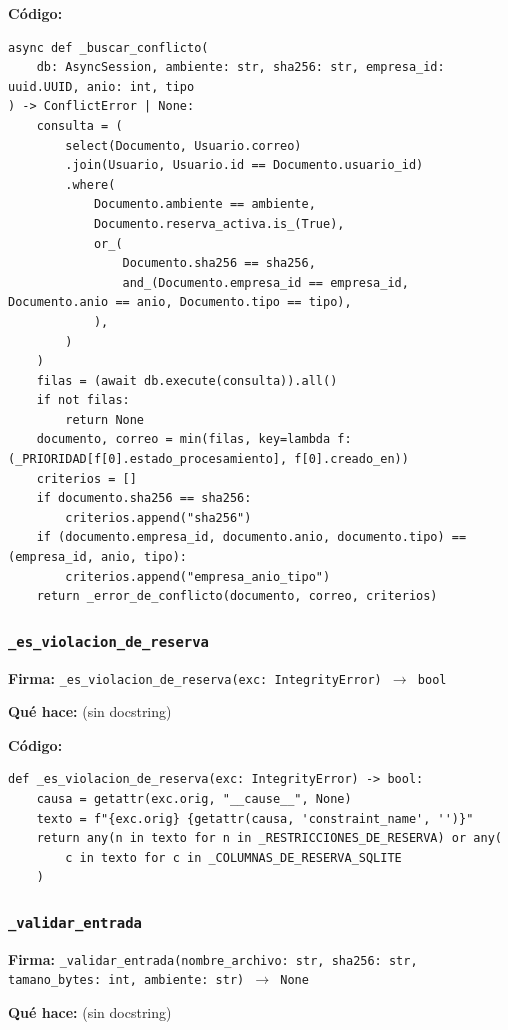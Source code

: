 \documentclass[11pt,a4paper]{article}
\begin{document}
\textbf{Código:}
\begin{lstlisting}
async def _buscar_conflicto(
    db: AsyncSession, ambiente: str, sha256: str, empresa_id: uuid.UUID, anio: int, tipo
) -> ConflictError | None:
    consulta = (
        select(Documento, Usuario.correo)
        .join(Usuario, Usuario.id == Documento.usuario_id)
        .where(
            Documento.ambiente == ambiente,
            Documento.reserva_activa.is_(True),
            or_(
                Documento.sha256 == sha256,
                and_(Documento.empresa_id == empresa_id, Documento.anio == anio, Documento.tipo == tipo),
            ),
        )
    )
    filas = (await db.execute(consulta)).all()
    if not filas:
        return None
    documento, correo = min(filas, key=lambda f: (_PRIORIDAD[f[0].estado_procesamiento], f[0].creado_en))
    criterios = []
    if documento.sha256 == sha256:
        criterios.append("sha256")
    if (documento.empresa_id, documento.anio, documento.tipo) == (empresa_id, anio, tipo):
        criterios.append("empresa_anio_tipo")
    return _error_de_conflicto(documento, correo, criterios)
\end{lstlisting}

\subsubsection*{\texttt{\_es\_violacion\_de\_reserva}}
\textbf{Firma:} \texttt{\_es\_violacion\_de\_reserva(exc: IntegrityError) $\rightarrow$ bool}

\textbf{Qué hace:} (sin docstring)

\textbf{Código:}
\begin{lstlisting}
def _es_violacion_de_reserva(exc: IntegrityError) -> bool:
    causa = getattr(exc.orig, "__cause__", None)
    texto = f"{exc.orig} {getattr(causa, 'constraint_name', '')}"
    return any(n in texto for n in _RESTRICCIONES_DE_RESERVA) or any(
        c in texto for c in _COLUMNAS_DE_RESERVA_SQLITE
    )
\end{lstlisting}

\subsubsection*{\texttt{\_validar\_entrada}}
\textbf{Firma:} \texttt{\_validar\_entrada(nombre\_archivo: str, sha256: str, tamano\_bytes: int, ambiente: str) $\rightarrow$ None}

\textbf{Qué hace:} (sin docstring)
\end{document}
